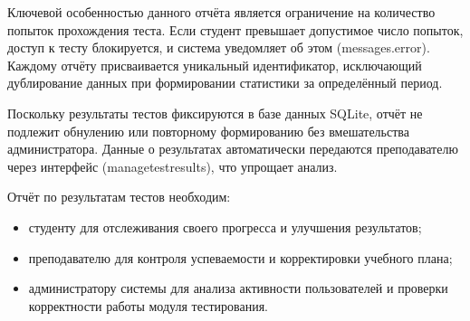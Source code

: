Ключевой особенностью данного отчёта является ограничение на количество попыток прохождения теста. Если студент превышает допустимое число попыток, доступ к тесту блокируется, и система уведомляет об этом (messages.error). Каждому отчёту присваивается уникальный идентификатор, исключающий дублирование данных при формировании статистики за определённый период.

Поскольку результаты тестов фиксируются в базе данных SQLite, отчёт не подлежит обнулению или повторному формированию без вмешательства администратора. Данные о результатах автоматически передаются преподавателю через интерфейс (managetestresults), что упрощает анализ. 

Отчёт по результатам тестов необходим: 

\begin{itemize}
	\item студенту для отслеживания своего прогресса и улучшения результатов; 
	\item преподавателю для контроля успеваемости и корректировки учебного плана; 
	\item администратору системы для анализа активности пользователей и проверки корректности работы модуля тестирования.
\end{itemize}

